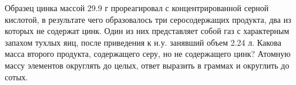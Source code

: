 
Образец цинка массой 29.9 г прореагировал с концентрированной серной кислотой, в результате чего
образовалось три серосодержащих продукта, два из которых не содержат цинк. Один
из них представляет собой газ с характерным запахом тухлых яиц, после
приведения к н.у. занявший объем 2.24 л. Какова масса второго продукта,
содержащего серу, но не содержащего цинк? Атомную массу элементов округлять до
целых, ответ выразить в граммах и округлить до сотых.

